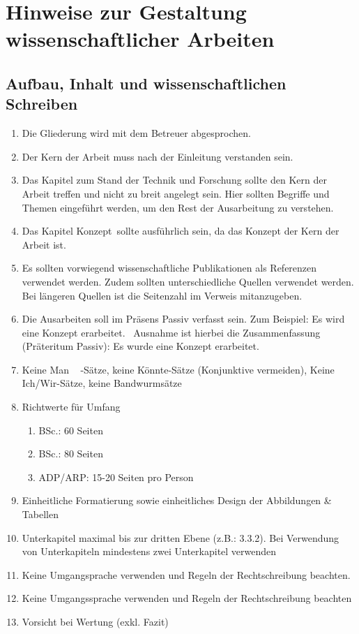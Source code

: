 \section{Hinweise zur Gestaltung wissenschaftlicher Arbeiten}

\subsection{Aufbau, Inhalt und wissenschaftlichen Schreiben}


\begin{enumerate}
    \item Die Gliederung wird mit dem Betreuer abgesprochen.
    \item Der Kern der Arbeit muss nach der Einleitung verstanden sein. 
    \item Das Kapitel zum Stand der Technik und Forschung sollte den Kern der Arbeit treffen und nicht zu breit angelegt sein. Hier sollten Begriffe und Themen eingeführt werden, um den Rest der Ausarbeitung zu verstehen. 
    \item Das Kapitel \glqq Konzept\grqq~sollte ausführlich sein, da das Konzept der Kern der Arbeit ist. 
    \item Es sollten vorwiegend wissenschaftliche Publikationen als Referenzen verwendet werden. Zudem sollten unterschiedliche Quellen verwendet werden. Bei längeren Quellen ist die Seitenzahl im Verweis mitanzugeben.
    \item Die Ausarbeiten soll im Präsens Passiv verfasst sein. Zum Beispiel: \glqq Es wird eine Konzept erarbeitet.\grqq~  Ausnahme ist hierbei die Zusammenfassung (Präteritum Passiv): \glqq Es wurde eine Konzept erarbeitet.\grqq~
    \item  Keine \grqq Man \grqq~ -Sätze, keine \glqq Könnte\grqq -Sätze (Konjunktive vermeiden), Keine \glqq Ich/Wir\grqq  -Sätze, keine Bandwurmsätze
    \item Richtwerte für Umfang
    \begin{enumerate}
        \item B\;Sc.: 60 Seiten 
        \item B\;Sc.: 80 Seiten
        \item ADP/ARP: 15-20 Seiten pro Person
    \end{enumerate}
    \item Einheitliche Formatierung sowie einheitliches Design der Abbildungen \& Tabellen
    \item Unterkapitel maximal bis zur dritten Ebene (z.B.: 3.3.2). Bei Verwendung von Unterkapiteln mindestens zwei Unterkapitel verwenden
    \item Keine Umgangsprache verwenden und Regeln der Rechtschreibung beachten.
    \item Keine Umgangssprache verwenden und Regeln der Rechtschreibung beachten
    \item Vorsicht bei Wertung (exkl. Fazit)
\end{enumerate}

